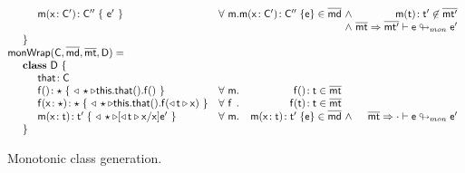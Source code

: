\documentclass[a4paper,USenglish]{tex/lipics-v2016}
\begin{document}
\begin{figure}[!ht]
\[\begin{array}{@{}ll@{}l@{}r@{~}c@{~}r}
\\
\SPP \Mdef\m\x{\Cp}{\Cpp} {~\ep~}
&    \All \m  \Mdef\m\x\Cp\Cpp\e\in\b\md &\wedge& \Mtype\m\t\tp\not\in \bmtp \\
&&&&\wedge&\rtranstz{\bmt}\bmtp{\e}{\ep}
\\
\SP \}
\\
\classgen{\C, \bmd, \bmt, \D} = \\
\SP \class~\D~\{\\
\SPP \Fdef \that \C\\ 
\SPP   \Mdefz\f\any{~\MonCast\any{\Get{{\Get\this\that}}\f}~}
&  \All \m  \Mtype\f{}\t \in \bmt\\
\SPP   \Mdef\f\x\any\any{~\MonCast\any{\Set{\Get\this\that}\f{\MonCast\t\x}}~}
&  \All \f  \Mtype\f\t\t \in \bmt\\
\SPP   \Mdef\m\x\t\tp {~\MonCast\any{{[\MonCast\t\x / \x] \ep}}~}
&  \All \m \Mdef\m\x\t\tp\e\in\b\md  &\wedge& \rtranstz{\bmt}\cdot{\e}{\ep}\\
\SP \}\\
\end{array}\]
\hrulefill
\caption{Monotonic class generation.}\label{classgen}
\end{figure}
\end{document}
